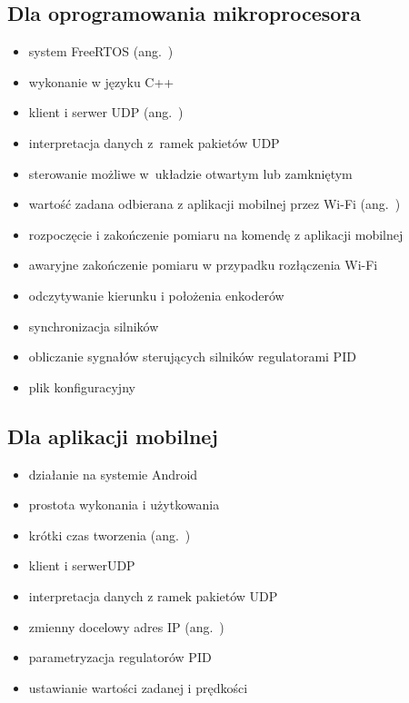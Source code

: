 \subsection*{Dla oprogramowania mikroprocesora}
\begin{itemize}
    \item system FreeRTOS (ang.~)
    \item wykonanie w języku C++
    \item klient i serwer UDP (ang.~)
    \item interpretacja danych z~ramek pakietów UDP
    \item sterowanie możliwe w~układzie otwartym lub zamkniętym
    \item wartość zadana odbierana z aplikacji mobilnej przez Wi-Fi (ang.~)
    \item rozpoczęcie i zakończenie pomiaru na komendę z aplikacji mobilnej
    \item awaryjne zakończenie pomiaru w przypadku rozłączenia Wi-Fi
    \item odczytywanie kierunku i położenia enkoderów
    \item synchronizacja silników
    \item obliczanie sygnałów sterujących silników regulatorami PID
    \item plik konfiguracyjny
\end{itemize}

\subsection*{Dla aplikacji mobilnej}
\begin{itemize}
    \item działanie na systemie Android
    \item prostota wykonania i użytkowania
    \item krótki czas tworzenia (ang.~)
    \item klient i serwerUDP
    \item interpretacja danych z ramek pakietów UDP
    \item zmienny docelowy adres IP (ang.~) 
    \item parametryzacja regulatorów PID
    \item ustawianie wartości zadanej i prędkości
\end{itemize}

